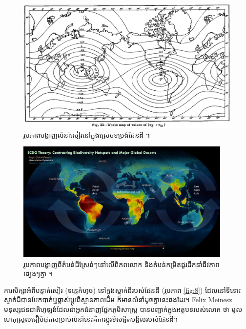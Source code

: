 \documentclass[10pt,twocolumn,letterpaper]{article}
\begin{document}
\begin{figure}[t]
\begin{center}
   \includegraphics[width=1\linewidth]{meinesz3.jpg}
\end{center}
   \caption{រូបភាពបង្ហាញលំនាំសៀរ​នៅក្នុងស្រេចទម្រង់ផែនដី \cite{36}។}
\label{fig:8}

\label{fig:onecol}
\end{figure}

\begin{figure}[t]
\begin{center}
\includegraphics[width=0.95\textwidth]{biodiversity.jpg}
\end{center}
   \caption{រូបភាពបង្ហាញពីតំបន់ដីស្រែធំៗនៅលើពិភពលោក និងតំបន់កម្រិតជួរដឹកនាំជីវភាពផ្សេងៗគ្នា \cite{28}។}
\label{fig:9}
\end{figure}

ការសិក្សាអំពីបន្ទាត់សៀរ (ទន្លេកំហូច) នៅក្នុងស្នាក់ដីរបស់ផែនដី (រូបភាព \ref{fig:8}) ដែលនៅទីនោះស្នាក់ដីបានបែកបាក់ឬផ្លាស់ប្តូរពីស្ថានភាពដើម ក៏មានលំនាំដូចគ្នានេះផងដែរ។ Felix Meinesz មនុស្សជនជាតិហូឡង់ដែលជាអ្នកជំនាញផ្នែកភូមិសាស្ត្រ បានបញ្ជាក់ក្នុងអត្ថបទរបស់លោក \cite{36} ថា មូលហេតុស្រួលជឿបំផុតសម្រាប់លំនាំនេះគឺការប្តូរទិសផ្ចិតបង្វិលរបស់ផែនដី។
\end{document}
